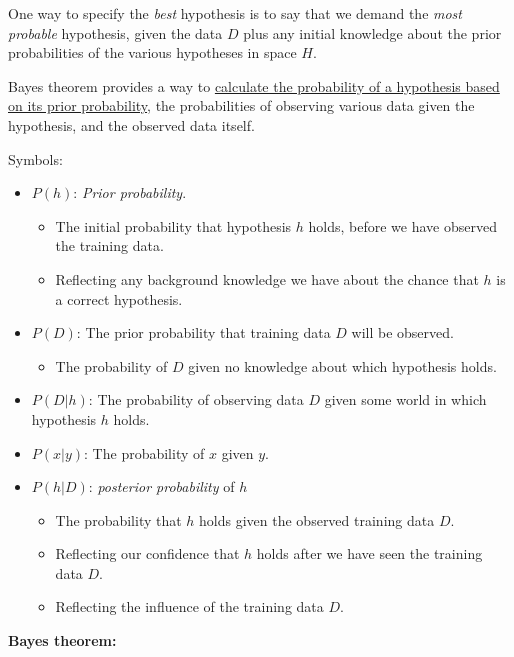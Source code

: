 One way to specify the \emph{best} hypothesis is to say that we demand
the \emph{most probable} hypothesis, given the data \(D\) plus any
initial knowledge about the prior probabilities of the various
hypotheses in space \(H\).

Bayes theorem provides a way to \ul{calculate the probability of a
hypothesis based on its prior probability}, the probabilities of
observing various data given the hypothesis, and the observed data
itself.

Symbols:

\begin{itemize}
\item
  \(P(h)\): \emph{Prior probability}.

  \begin{itemize}
  \item
    The initial probability that hypothesis \(h\) holds, before we have
    observed the training data.
  \item
    Reflecting any background knowledge we have about the chance that
    \(h\) is a correct hypothesis.
  \end{itemize}
\item
  \(P(D)\): The prior probability that training data \(D\) will be
  observed.

  \begin{itemize}
  \item
    The probability of \(D\) given no knowledge about which hypothesis
    holds.
  \end{itemize}
\item
  \(P(D|h)\): The probability of observing data \(D\) given some world
  in which hypothesis \(h\) holds.
\item
  \(P(x|y)\): The probability of \(x\) given \(y\).
\item
  \(P(h|D)\): \emph{posterior probability} of \(h\)

  \begin{itemize}
  \item
    The probability that \(h\) holds given the observed training data
    \(D\).
  \item
    Reflecting our confidence that \(h\) holds after we have seen the
    training data \(D\).
  \item
    Reflecting the influence of the training data \(D\).
  \end{itemize}
\end{itemize}

\textbf{Bayes theorem:}

